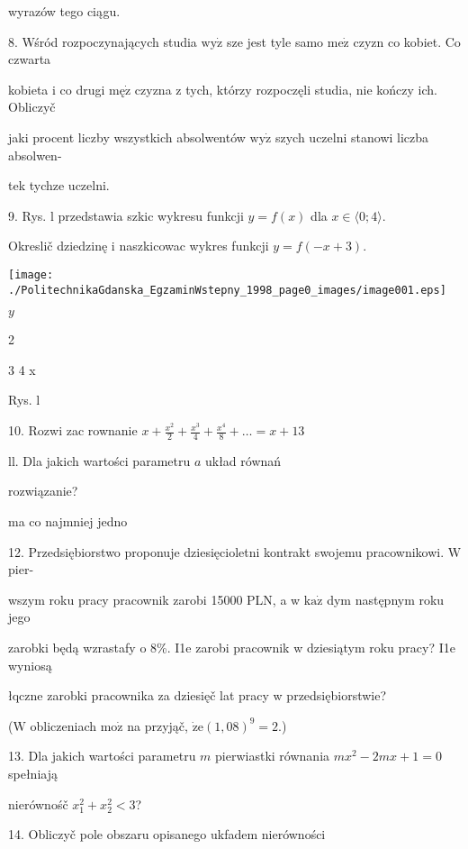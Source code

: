 \documentclass[a4paper,12pt]{article}
\begin{document}
wyrazów tego ciągu.

8. Wśród rozpoczynających studia $\mathrm{w}\mathrm{y}\dot{\mathrm{z}}$ sze jest tyle samo $\mathrm{m}\mathrm{e}\dot{\mathrm{z}}$ czyzn co kobiet. Co czwarta

kobieta i co drugi $\mathrm{m}\text{ę}\dot{\mathrm{z}}$ czyzna z tych, którzy rozpoczęli studia, nie kończy ich. Obliczyč

jaki procent liczby wszystkich absolwentów $\mathrm{w}\mathrm{y}\dot{\mathrm{z}}$ szych uczelni stanowi liczba absolwen-

tek tychze uczelni.

9. Rys. l przedstawia szkic wykresu funkcji $y=f(x)$ dla $x\in\langle 0;4\rangle.$

Okreslič dziedzinę i naszkicowac wykres funkcji $y=f(-x+3).$
\begin{center}
\texttt{[image: ./PolitechnikaGdanska\_EgzaminWstepny\_1998\_page0\_images/image001.eps]}
\end{center}
$y$

2

3 4 x

Rys. l

10. Rozwi zac rownanie $x+\displaystyle \frac{x^{2}}{2}+\frac{x^{3}}{4}+\frac{x^{4}}{8}+\ldots=x+13$

ll. Dla jakich wartości parametru $a$ układ równań 

rozwiązanie?

ma co najmniej jedno

12. Przedsiębiorstwo proponuje dziesięcioletni kontrakt swojemu pracownikowi. $\mathrm{W}$ pier-

wszym roku pracy pracownik zarobi 15000 PLN, a w $\mathrm{k}\mathrm{a}\dot{\mathrm{z}}$ dym następnym roku jego

zarobki będą wzrastafy o 8\%. I1e zarobi pracownik w dziesiątym roku pracy? I1e wyniosą

łqczne zarobki pracownika za dziesięč lat pracy w przedsiębiorstwie?

($\mathrm{W}$ obliczeniach $\mathrm{m}\mathrm{o}\dot{\mathrm{z}}$ na przyjąč, $\dot{\mathrm{z}}\mathrm{e}(1,08)^{9}=2.$)

13. Dla jakich wartości parametru $m$ pierwiastki równania $mx^{2}-2mx+1=0$ spełniają

nierównośč $x_{1}^{2}+x_{2}^{2}<3$?




14. Obliczyč pole obszaru opisanego ukfadem nierówności 
\end{document}
